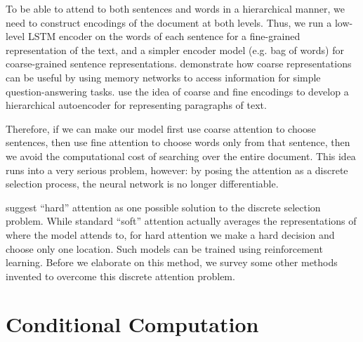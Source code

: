 \documentclass[11pt]{report}
\begin{document}
To be able to attend to both sentences and words in a hierarchical manner, we need to construct encodings of the document at both levels. Thus, we run a low-level LSTM encoder on the words of each sentence for a fine-grained representation of the text, and a simpler encoder model (e.g. bag of words) for coarse-grained sentence representations.
\citet{Sukhbaatar2015} demonstrate how coarse representations can be useful by using memory networks to access information for simple question-answering tasks.
\citet{li2015autoencoder} use the idea of coarse and fine encodings to develop a hierarchical autoencoder for representing paragraphs of text.

Therefore, if we can make our model first use coarse attention to choose sentences, then use fine attention to choose words only from that sentence, then we avoid the computational cost of searching over the entire document. This idea runs into a very serious problem, however: by posing the attention as a discrete selection process, the neural network is no longer differentiable.


\citet{xu2015captioning} suggest ``hard'' attention as one possible solution to the discrete selection problem. While standard ``soft'' attention actually averages the representations of where the model attends to, for hard attention we make a hard decision and choose only one location. Such models can be trained using reinforcement learning. Before we elaborate on this method, we survey some other methods invented to overcome this discrete attention problem.

\section{Conditional Computation}


\end{document}
